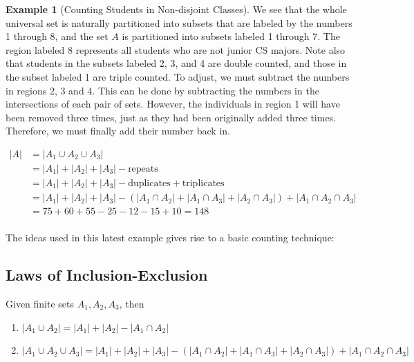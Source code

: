 \documentclass[10pt,]{book}
\theoremstyle{plain}
\theoremstyle{definition}
\newtheorem{example}[theorem]{Example}
\begin{document}
\begin{example}[Counting Students in Non-disjoint Classes]
 We see that the whole universal set is naturally partitioned into subsets that are labeled by the numbers 1 through 8, and the set \(A\)  is  partitioned into subsets labeled 1 through 7. The region labeled 8 represents all students who are not junior CS majors.  Note also that students in the subsets labeled 2, 3, and 4 are double counted, and those in the subset labeled 1 are triple counted. To adjust, we must subtract the numbers in regions 2, 3 and 4.  This can be done by subtracting the numbers in the intersections of each pair of sets.  However, the individuals in region 1 will have been removed three times, just as they had been originally added three times.  Therefore, we must finally add their number back in.
%
\par
\[\begin{split}
 \lvert A \rvert & =  \lvert A_1 \cup A_2 \cup A_3 \rvert \\ 
 & = \lvert A_1 \rvert + \lvert A_2 \rvert + \lvert A_3 \rvert - \textrm{repeats} \\
 & = \lvert A_1 \rvert + \lvert A_2 \rvert + \lvert A_3 \rvert - \textrm{duplicates} + \textrm{triplicates}  \\
 & = \lvert A_1 \rvert + \lvert A_2 \rvert + \lvert A_3 \rvert - (\lvert A_1 \cap A_2 \rvert + \lvert A_1 \cap A_3 \rvert+ \lvert A_2 \cap A_3 \rvert) + \lvert A_1 \cap A_2 \cap A_3 \rvert  \\
 & = 75 + 60 + 55 - 25 - 12 - 15 + 10 = 148 \\
\end{split}
\]
%
\end{example}
\par

The ideas used in this latest example gives rise to a basic counting technique:
%
\typeout{************************************************}
\typeout{************************************************}
\subsection[Laws of Inclusion-Exclusion]{Laws of Inclusion-Exclusion}\label{inclusion-exclusion}
Given finite sets \(A_1, A_2, A_3\), then
\leavevmode%
\begin{enumerate}
\item\hypertarget{li-227}{}\( \lvert A_1 \cup A_2 \rvert =\lvert A_1 \rvert + \lvert A_2 \rvert - \lvert A_1 \cap A_2 \rvert  \)\item\hypertarget{li-228}{}\(  \lvert A_1 \cup A_2 \cup A_3 \rvert =\lvert A_1 \rvert + \lvert A_2 \rvert + \lvert A_3 \rvert - (\lvert A_1 \cap A_2 \rvert + \lvert A_1 \cap A_3 \rvert+ \lvert A_2 \cap A_3 \rvert) + \lvert A_1 \cap A_2 \cap A_3 \rvert \)\end{enumerate}
 
\end{document}
